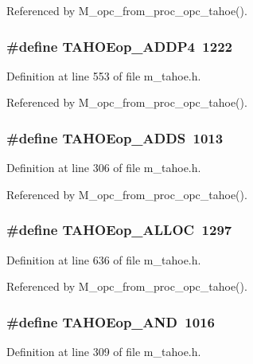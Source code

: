 Referenced by M\_\-opc\_\-from\_\-proc\_\-opc\_\-tahoe().
\subsubsection{\setlength{\rightskip}{0pt plus 5cm}\#define TAHOEop\_\-ADDP4~1222}\label{m__tahoe_8h_9f304b9419441f13c04e94272ecd8503}




Definition at line 553 of file m\_\-tahoe.h.

Referenced by M\_\-opc\_\-from\_\-proc\_\-opc\_\-tahoe().
\subsubsection{\setlength{\rightskip}{0pt plus 5cm}\#define TAHOEop\_\-ADDS~1013}\label{m__tahoe_8h_bfe04bf8a516c683a8b27079b44b7cb0}




Definition at line 306 of file m\_\-tahoe.h.

Referenced by M\_\-opc\_\-from\_\-proc\_\-opc\_\-tahoe().
\subsubsection{\setlength{\rightskip}{0pt plus 5cm}\#define TAHOEop\_\-ALLOC~1297}\label{m__tahoe_8h_6ca4a2785fa319cea303b783b5e079dc}




Definition at line 636 of file m\_\-tahoe.h.

Referenced by M\_\-opc\_\-from\_\-proc\_\-opc\_\-tahoe().
\subsubsection{\setlength{\rightskip}{0pt plus 5cm}\#define TAHOEop\_\-AND~1016}\label{m__tahoe_8h_ede50fe91d7e3b84aabbaf802a6af70a}




Definition at line 309 of file m\_\-tahoe.h.

